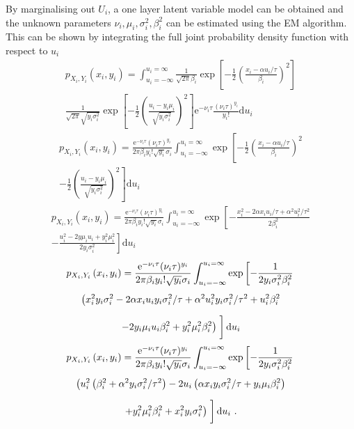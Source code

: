 \documentclass[12pt]{report}
\newcommand{\euler}{\mathrm{e}}
\newcommand{\diff}{\mathrm{d}}
\begin{document}
By marginalising out $U_i$, a one layer latent variable model can be obtained and the unknown parameters $\nu_i,\mu_i,\sigma_i^2,\beta_i^2$ can be estimated using the EM algorithm. This can be shown by integrating the full joint probability density function with respect to $u_i$
\begin{multline*}
p_{X_i,Y_i}\left(x_i,y_i\right)=\int_{u_i=-\infty}^{u_i=\infty}
\frac{1}{\sqrt{2\pi}\beta_i}\exp\left[-\frac{1}{2}\left(\frac{x_i-\alpha u_i /\tau}{\beta_i}\right)^2\right]
\\
\frac{1}{\sqrt{2\pi}\sqrt{y_i\sigma_i^2}}\exp\left[-\frac{1}{2}\left(\frac{u_i-y_i\mu_i}{\sqrt{y_i\sigma_i^2}}\right)^2\right]
\euler^{-\nu_i\tau}\frac{(\nu_i\tau)^{y_i}}{y_i!} \diff u_i
\end{multline*}
\begin{multline*}
p_{X_i,Y_i}\left(x_i,y_i\right)=\frac{\euler^{-\nu_i\tau}(\nu_i\tau)^{y_i}}{2\pi\beta_iy_i!\sqrt{y_i}\sigma_i}\int_{u_i=-\infty}^{u_i=\infty}
\exp\left[-\frac{1}{2}\left(\frac{x_i-\alpha u_i /\tau}{\beta_i}\right)^2
\right.
\\
\left.
-\frac{1}{2}\left(\frac{u_i-y_i\mu_i}{\sqrt{y_i\sigma_i^2}}\right)^2\right] \diff u_i
\end{multline*}
\begin{multline*}
p_{X_i,Y_i}\left(x_i,y_i\right)=\frac{\euler^{-\nu_i\tau}(\nu_i\tau)^{y_i}}{2\pi\beta_iy_i!\sqrt{y_i}\sigma_i}\int_{u_i=-\infty}^{u_i=\infty}
\exp\left[-\frac{x_i^2-2\alpha x_i u_i /\tau + \alpha^2 u_i^2/\tau^2}{2\beta_i^2}
\right.
\\
\left.
-\frac{u_i^2-2y\mu_i u_i + y_i^2\mu_i^2}{2y_i\sigma_i^2}\right] \diff u_i
\end{multline*}
\begin{multline*}
p_{X_i,Y_i}\left(x_i,y_i\right)=\frac{\euler^{-\nu_i\tau}(\nu_i\tau)^{y_i}}{2\pi\beta_iy_i!\sqrt{y_i}\sigma_i}\int_{u_i=-\infty}^{u_i=\infty}
\exp\left[-\frac{1}{2y_i\sigma_i^2\beta_i^2}
\right.
\\
\left.\vphantom{\frac{1}{2y_i\sigma_i^2\beta_i^2}}\left(
x_i^2y_i\sigma_i^2-2\alpha x_i u_i y_i\sigma_i^2 /\tau + \alpha^2 u_i^2 y_i\sigma_i^2/\tau^2+u_i^2\beta_i^2
\right.\right.
\\
\left.
-2y_i\mu_i u_i\beta_i^2 + y_i^2\mu_i^2\beta_i^2\right)
\left.\vphantom{\frac{1}{2y_i\sigma_i^2\beta_i^2}}\right] \diff u_i
\end{multline*}
\begin{multline*}
p_{X_i,Y_i}\left(x_i,y_i\right)=\frac{\euler^{-\nu_i\tau}(\nu_i\tau)^{y_i}}{2\pi\beta_iy_i!\sqrt{y_i}\sigma_i}\int_{u_i=-\infty}^{u_i=\infty}
\exp\left[-\frac{1}{2y_i\sigma_i^2\beta_i^2}
\right.
\\
\left.\vphantom{-\frac{1}{2y_i\sigma_i^2\beta_i^2}}\left(
u_i^2\left(\beta_i^2+\alpha^2y_i\sigma_i^2/\tau^2\right)-2u_i\left(\alpha x_iy_i\sigma_i^2/\tau+y_i\mu_i\beta_i^2\right)
\right.\right.
\\
\left.
+y_i^2\mu_i^2\beta_i^2+x_i^2y_i\sigma_i^2
 \right)\left.\vphantom{-\frac{1}{2y_i\sigma_i^2\beta_i^2}}\right] \diff u_i \ .
\end{multline*}
\end{document}
